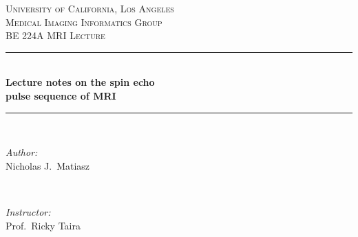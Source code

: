 \documentclass[12pt]{article} %
\begin{document}
\begin{titlepage}

\newcommand{\HRule}{\rule{\linewidth}{0.5mm}} %

\center %
 

\textsc{\Large University of California, Los Angeles}\\[1.5cm] %
\textsc{\large Medical Imaging Informatics Group}\\[0.5cm] %
\textsc{\large BE 224A MRI Lecture}\\[0.5cm] %

\vspace{20pt}
\HRule \\[0.5cm]
\LARGE{\textbf{Lecture notes on the spin echo}}\\[.3cm]
\LARGE{\textbf{pulse sequence of MRI}}\\
\HRule \\[1.5cm]
 

\begin{minipage}{0.4\textwidth}
\begin{flushleft} \large
\emph{Author:}\\
Nicholas J.\ Matiasz %
\end{flushleft}
\end{minipage}
~
\begin{minipage}{0.4\textwidth}
\begin{flushright} \large
\emph{Instructor:} \\
Prof.\ Ricky Taira %
\end{flushright}
\end{minipage}\\[4cm]


\end{titlepage}
\end{document}
